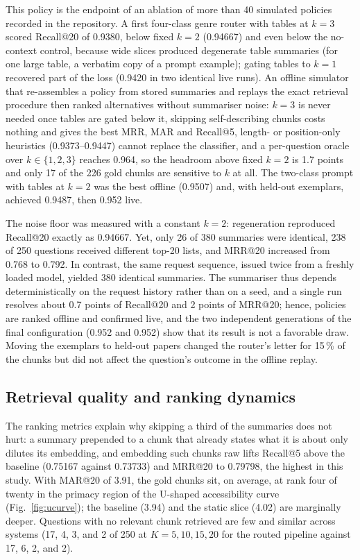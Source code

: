 \documentclass[pdflatex,sn-mathphys-num]{sn-jnl}
\makeatletter
\newcommand{\Rec}[1]{Recall@#1}
\newcommand{\MRR}[1]{MRR@#1}
\newcommand{\MAR}[1]{MAR@#1}
\theoremstyle{thmstyleone}%
\theoremstyle{thmstylethree}%
\makeatother
\begin{document}
This policy is the endpoint of an ablation of more than 40 simulated policies recorded in the repository. A first four-class genre router with tables at $k=3$ scored \Rec{20} of 0.9380, below fixed $k=2$ (0.94667) and even below the no-context control, because wide slices produced degenerate table summaries (for one large table, a verbatim copy of a prompt example); gating tables to $k=1$ recovered part of the loss (0.9420 in two identical live runs). An offline simulator that re-assembles a policy from stored summaries and replays the exact retrieval procedure then ranked alternatives without summariser noise: $k=3$ is never needed once tables are gated below it, skipping self-describing chunks costs nothing and gives the best MRR, MAR and \Rec{5}, length- or position-only heuristics (0.9373--0.9447) cannot replace the classifier, and a per-question oracle over $k\in\{1,2,3\}$ reaches 0.964, so the headroom above fixed $k=2$ is 1.7 points and only 17 of the 226 gold chunks are sensitive to $k$ at all. The two-class prompt with tables at $k=2$ was the best offline (0.9507) and, with held-out exemplars, achieved 0.9487, then 0.952 live.

The noise floor was measured with a constant $k=2$: regeneration reproduced \Rec{20} exactly as 0.94667. Yet, only 26 of 380 summaries were identical, 238 of 250 questions received different top-20 lists, and \MRR{20} increased from 0.768 to 0.792. In contrast, the same request sequence, issued twice from a freshly loaded model, yielded 380 identical summaries. The summariser thus depends deterministically on the request history rather than on a seed, and a single run resolves about 0.7 points of \Rec{20} and 2 points of \MRR{20}; hence, policies are ranked offline and confirmed live, and the two independent generations of the final configuration (0.952 and 0.952) show that its result is not a favorable draw. Moving the exemplars to held-out papers changed the router's letter for 15\,\% of the chunks but did not affect the question's outcome in the offline replay.

\subsection{Retrieval quality and ranking dynamics}\label{sec:ranking}

The ranking metrics explain why skipping a third of the summaries does not hurt: a summary prepended to a chunk that already states what it is about only dilutes its embedding, and embedding such chunks raw lifts \Rec{5} above the baseline (0.75167 against 0.73733) and \MRR{20} to 0.79798, the highest in this study. With \MAR{20} of 3.91, the gold chunks sit, on average, at rank four of twenty in the primacy region of the U-shaped accessibility curve (Fig.~\ref{fig:ucurve}); the baseline (3.94) and the static slice (4.02) are marginally deeper. Questions with no relevant chunk retrieved are few and similar across systems (17, 4, 3, and 2 of 250 at $K=5,10,15,20$ for the routed pipeline against 17, 6, 2, and 2).
\end{document}
